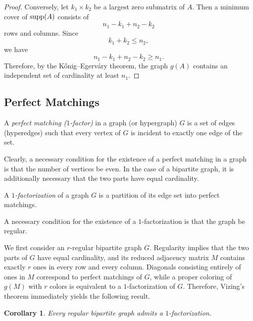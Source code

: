\documentclass[11pt]{article}
\newtheorem{corollary}{Corollary}[section]
\theoremstyle{definition}
\newcommand{\supp}{{\rm supp}}
\begin{document}
{{{\begin{proof}
Conversely, let $k_1\times k_2$ be a largest zero submatrix of $A$.
Then a minimum cover of $\supp(A)$ consists of
\[
n_1-k_1+n_2-k_2
\]
rows and columns.
Since
\[
k_1+k_2\le n_2,
\]
we have
\[
n_1-k_1+n_2-k_2\ge n_1.
\]
Therefore, by the Kőnig--Egerváry theorem, the graph $g(A)$ contains an
independent set of cardinality at least $n_1$.
\end{proof}


\subsection{Perfect Matchings}\label{7.3}

A {\sl perfect matching ($1$-factor)} in a graph (or hypergraph) $G$
is a set of edges (hyperedges) such that every vertex of $G$ is
incident to exactly one edge of the set.

Clearly, a necessary condition for the existence of a perfect matching
in a graph is that the number of vertices be even. In the case of a
bipartite graph, it is additionally necessary that the two parts have
equal cardinality.

A {\sl $1$-factorization} of a graph $G$ is a partition of its edge set
into perfect matchings.

A necessary condition for the existence of a $1$-factorization is that
the graph be regular.

We first consider an $r$-regular bipartite graph $G$.
Regularity implies that the two parts of $G$ have equal cardinality,
and its reduced adjacency matrix $M$ contains exactly $r$ ones in every
row and every column.
Diagonals consisting entirely of ones in $M$ correspond to perfect
matchings of $G$, while a proper coloring of $g(M)$ with $r$
colors is equivalent to a $1$-factorization of $G$.
Therefore, Vizing's theorem immediately yields the following result.

\begin{corollary}\label{konig}
Every regular bipartite graph admits a $1$-factorization.
\end{corollary}







}}}
\end{document}
